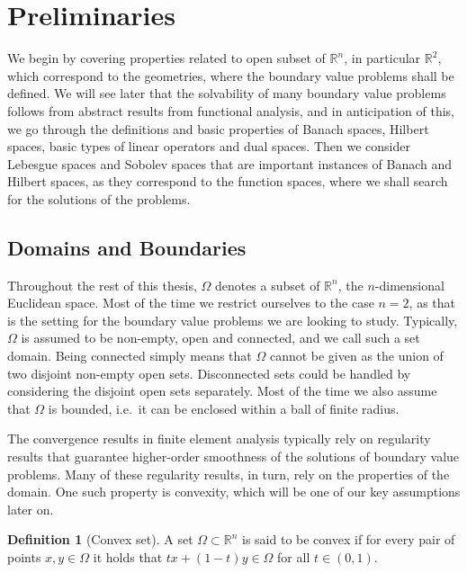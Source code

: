 \documentclass[english, 12pt, a4paper, sci, utf8, a-2b, online]{aaltothesis}
\theoremstyle{definition}
\newtheorem{definition}{Definition}[section]
\theoremstyle{plain}
\numberwithin{equation}{section}
\begin{document}
\clearpage

\section{Preliminaries}
\label{sec:preliminaries}

We begin by covering properties related to open subset of $\mathbb{R}^n$,
in particular $\mathbb{R}^2$, which correspond to the geometries, where
the boundary value problems shall be defined.
We will see later that the solvability of many boundary value problems
follows from abstract results from functional analysis, and
in anticipation of this, we go through the definitions and basic properties
of Banach spaces, Hilbert spaces, basic types of linear operators
and dual spaces. Then we consider Lebesgue spaces and Sobolev spaces
that are important instances of Banach and Hilbert spaces, as they correspond
to the function spaces, where we shall search for the solutions of the problems.

\subsection{Domains and Boundaries}
\label{subsec:domains}

Throughout the rest of this thesis, $\Omega$ denotes a subset of $\mathbb{R}^n$,
the $n$-dimensional Euclidean space. Most of the time we restrict
ourselves to the case $n=2$, as that is the setting for the boundary
value problems we are looking to study.
Typically, $\Omega$ is assumed to be non-empty, open and connected,
and we call such a set domain.
Being connected simply means that $\Omega$ cannot be given
as the union of two disjoint non-empty open sets.
Disconnected sets could be handled by considering the
disjoint open sets separately. Most of the time we also assume
that $\Omega$ is bounded, i.e.\ it can be enclosed within a ball of
finite radius.

The convergence results in finite element analysis typically rely on regularity 
results that guarantee higher-order smoothness of the solutions of boundary
value problems. Many of these regularity results, in turn, rely on the 
properties of the domain. One such property is convexity, which will be one 
of our key assumptions later on.
\begin{definition}[Convex set]
    \label{def:convexity}
    A set $\Omega \subset \mathbb{R}^n$ is said to be convex if for every
    pair of points $x,y \in \Omega$ it holds that $tx + (1-t)y \in \Omega$
    for all $t \in (0,1)$.
\end{definition}
\end{document}
